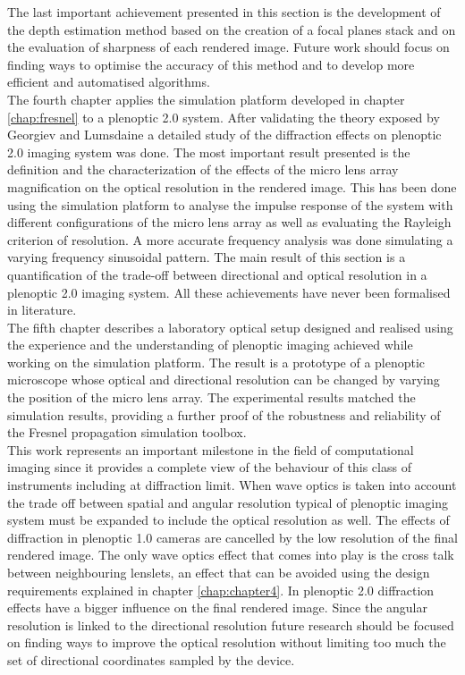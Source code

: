 The last important achievement presented in this section is the development of the depth estimation method based on the creation of a focal planes stack and on the evaluation of sharpness of each rendered image. Future work should focus on finding ways to optimise the accuracy of this method and to develop more efficient and automatised algorithms.\\ 
The fourth chapter applies the simulation platform developed in chapter \ref{chap:fresnel} to a plenoptic 2.0 system. After validating the theory exposed by Georgiev and Lumsdaine \cite{georgiev2010focused} a detailed study of the diffraction effects on plenoptic 2.0 imaging system was done. The most important result presented is the definition and the characterization of the effects of the micro lens array magnification on the optical resolution in the rendered image. This has been done using the simulation platform to analyse the impulse response of the system with different configurations of the micro lens array as well as evaluating the Rayleigh criterion of resolution. A more accurate frequency analysis was done simulating a varying frequency sinusoidal pattern. The main result of this section is a quantification of the trade-off between directional and optical resolution in a plenoptic 2.0 imaging system. All these achievements have never been formalised in literature. \\
The fifth chapter describes a laboratory optical setup designed and realised using the experience and the understanding of plenoptic imaging achieved while working on the simulation platform. The result is a prototype of a plenoptic microscope whose optical and directional resolution can be changed by varying the position of the micro lens array. The experimental results matched the simulation results, providing a further proof of the robustness and reliability of the Fresnel propagation simulation toolbox.\\
This work represents an important milestone in the field of computational imaging since it provides a complete view of the behaviour of this class of instruments including at diffraction limit. When wave optics is taken into account the trade off between spatial and angular resolution typical of plenoptic imaging system must be expanded to include the optical resolution as well. The effects of diffraction in plenoptic 1.0 cameras are cancelled by the low resolution of the final rendered image. The only wave optics effect that comes into play is the cross talk between neighbouring lenslets, an effect that can be avoided using the design requirements explained in chapter \ref{chap:chapter4}. In plenoptic 2.0 diffraction effects have a bigger influence on the final rendered image. Since the angular resolution is linked to the directional resolution future research should be focused on finding ways to improve the optical resolution without limiting too much the set of directional coordinates sampled by the device. \\
